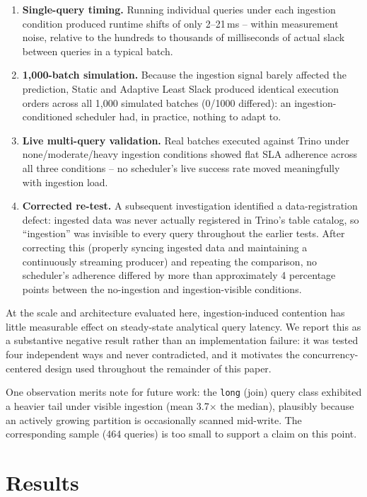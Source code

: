 \documentclass[conference]{IEEEtran}
\begin{document}
\begin{enumerate}
\item \textbf{Single-query timing.} Running individual queries under each ingestion condition produced runtime shifts of only 2--21\,ms -- within measurement noise, relative to the hundreds to thousands of milliseconds of actual slack between queries in a typical batch.
\item \textbf{1{,}000-batch simulation.} Because the ingestion signal barely affected the prediction, Static and Adaptive Least Slack produced identical execution orders across all 1{,}000 simulated batches (0/1000 differed): an ingestion-conditioned scheduler had, in practice, nothing to adapt to.
\item \textbf{Live multi-query validation.} Real batches executed against Trino under none/moderate/heavy ingestion conditions showed flat SLA adherence across all three conditions -- no scheduler's live success rate moved meaningfully with ingestion load.
\item \textbf{Corrected re-test.} A subsequent investigation identified a data-registration defect: ingested data was never actually registered in Trino's table catalog, so ``ingestion'' was invisible to every query throughout the earlier tests. After correcting this (properly syncing ingested data and maintaining a continuously streaming producer) and repeating the comparison, no scheduler's adherence differed by more than approximately 4 percentage points between the no-ingestion and ingestion-visible conditions.
\end{enumerate}

At the scale and architecture evaluated here, ingestion-induced contention has little measurable effect on steady-state analytical query latency. We report this as a substantive negative result rather than an implementation failure: it was tested four independent ways and never contradicted, and it motivates the concurrency-centered design used throughout the remainder of this paper.

One observation merits note for future work: the \texttt{long} (join) query class exhibited a heavier tail under visible ingestion (mean 3.7$\times$ the median), plausibly because an actively growing partition is occasionally scanned mid-write. The corresponding sample (464 queries) is too small to support a claim on this point.

\section{Results}
\label{sec:results}
\end{document}

